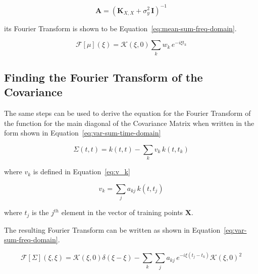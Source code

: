 \documentclass[12pt]{article}
\begin{document}
    \begin{equation}
         \mathbf{A} = (\mathbf{K}_{X,X} + \sigma^2_y \, \mathbf{I})^{-1} \label{eq:A}
    \end{equation}

    \noindent its Fourier Transform is shown to be Equation~\ref{eq:mean-sum-freq-domain}.

    \begin{equation}
        \mathcal{F}[{\mu}](\xi) = \mathcal{K}(\xi,0) \sum_k w_k \, e^{- i \xi t_k} \label{eq:mean-sum-freq-domain}
    \end{equation}

    \subsection{Finding the Fourier Transform of the Covariance}

    The same steps can be used to derive the equation for the Fourier Transform of the function for the main diagonal of the Covariance Matrix when written in the form shown in Equation~\ref{eq:var-sum-time-domain}

    \begin{equation}
        \Sigma(t, t) = k(t,t) - \sum_k v_k \, k(t,t_k) \label{eq:var-sum-time-domain}
    \end{equation}

    \noindent where $v_k$ is defined in Equation~\ref{eq:v_k}

    \begin{equation}
        v_k = \sum_j a_{kj} \, k(t,t_j) \label{eq:v_k}
    \end{equation}

    \noindent where $t_j$ is the $j^{th}$ element in the vector of training points $\mathbf{X}$.

    The resulting Fourier Transform can be written as shown in Equation~\ref{eq:var-sum-freq-domain}.


    \begin{equation}
        \mathcal{F}[\Sigma](\xi, \xi) = \mathcal{K}(\xi,0) \delta(\xi - \xi)  - \sum_k \sum_j a_{kj} \, e^{-i \xi (t_j - t_k)} \mathcal{K}(\xi,0)^2 \label{eq:var-sum-freq-domain}
    \end{equation}
\end{document}
